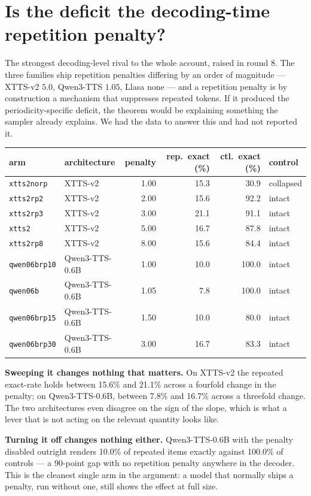 \documentclass[11pt]{article}
\begin{document}
\section{Is the deficit the decoding-time repetition penalty?}
\label{sec:s15}

The strongest decoding-level rival to the whole account, raised in round 8. The
three families ship repetition penalties differing by an order of magnitude ---
XTTS-v2 $5.0$, Qwen3-TTS $1.05$, Llasa none --- and a repetition penalty is by
construction a mechanism that suppresses repeated tokens. If it produced the
periodicity-specific deficit, the theorem would be explaining something the
sampler already explains. We had the data to answer this and had not reported it.

\begin{center}
\begin{tabular}{llrrrl}
\toprule
arm & architecture & penalty & rep.\ exact (\%) & ctl.\ exact (\%) & control \\
\midrule
\texttt{xtts2norp} & XTTS-v2 & 1.00 & 15.3 & 30.9 & collapsed \\
\texttt{xtts2rp2} & XTTS-v2 & 2.00 & 15.6 & 92.2 & intact \\
\texttt{xtts2rp3} & XTTS-v2 & 3.00 & 21.1 & 91.1 & intact \\
\texttt{xtts2} & XTTS-v2 & 5.00 & 16.7 & 87.8 & intact \\
\texttt{xtts2rp8} & XTTS-v2 & 8.00 & 15.6 & 84.4 & intact \\
\texttt{qwen06brp10} & Qwen3-TTS-0.6B & 1.00 & 10.0 & 100.0 & intact \\
\texttt{qwen06b} & Qwen3-TTS-0.6B & 1.05 & 7.8 & 100.0 & intact \\
\texttt{qwen06brp15} & Qwen3-TTS-0.6B & 1.50 & 10.0 & 80.0 & intact \\
\texttt{qwen06brp30} & Qwen3-TTS-0.6B & 3.00 & 16.7 & 83.3 & intact \\
\bottomrule
\end{tabular}
\end{center}

\noindent\textbf{Sweeping it changes nothing that matters.} On XTTS-v2 the
repeated exact-rate holds between 15.6\% and 21.1\% across a fourfold
change in the penalty; on Qwen3-TTS-0.6B, between 7.8\% and 16.7\% across
a threefold change. The two architectures even disagree on the sign of the slope,
which is what a lever that is not acting on the relevant quantity looks like.

\noindent\textbf{Turning it off changes nothing either.} Qwen3-TTS-0.6B with the
penalty disabled outright renders 10.0\% of repeated items exactly against
100.0\% of controls --- a 90-point gap with no repetition penalty
anywhere in the decoder. This is the cleanest single arm in the argument: a model
that normally ships a penalty, run without one, still shows the effect at full
size.
\end{document}
